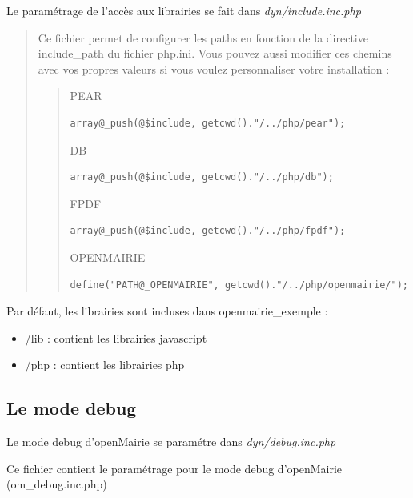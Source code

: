 \documentclass[letterpaper,10pt,french]{manual}
\begin{document}
Le paramétrage de l'accès aux librairies se fait dans \emph{dyn/include.inc.php}
\begin{quote}

Ce fichier permet de configurer les paths en fonction de la
directive include\_path du fichier php.ini.
Vous pouvez aussi modifier ces chemins avec vos propres valeurs si
vous voulez personnaliser votre installation :
\begin{quote}

PEAR

\begin{Verbatim}[commandchars=@\[\]]
array@_push(@$include, getcwd()."/../php/pear");
\end{Verbatim}

DB

\begin{Verbatim}[commandchars=@\[\]]
array@_push(@$include, getcwd()."/../php/db");
\end{Verbatim}

FPDF

\begin{Verbatim}[commandchars=@\[\]]
array@_push(@$include, getcwd()."/../php/fpdf");
\end{Verbatim}

OPENMAIRIE

\begin{Verbatim}[commandchars=@\[\]]
define("PATH@_OPENMAIRIE", getcwd()."/../php/openmairie/");
\end{Verbatim}
\end{quote}
\end{quote}

Par défaut, les librairies sont incluses dans openmairie\_exemple :
\begin{itemize}
\item {} 
/lib : contient les librairies javascript

\item {} 
/php : contient les librairies php

\end{itemize}


\subsection{Le mode debug}

Le mode debug d'openMairie se paramétre dans  \emph{dyn/debug.inc.php}

Ce fichier contient le paramétrage pour le mode debug
d'openMairie (om\_debug.inc.php)
\end{document}
